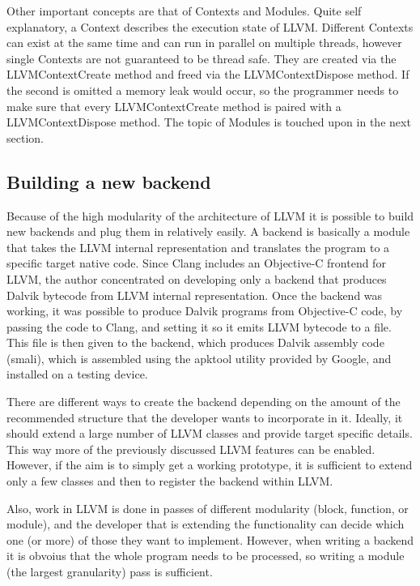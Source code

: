 \documentclass[parskip]{cs4rep}
\begin{document}
Other important concepts are that of Contexts and Modules. Quite self explanatory, a Context describes the execution state of LLVM. Different Contexts can exist at the same time and can run in parallel on multiple threads, however single Contexts are not guaranteed to be thread safe. They are created via the LLVMContextCreate method and freed via the LLVMContextDispose method. If the second is omitted a memory leak would occur, so the programmer needs to make sure that every LLVMContextCreate method is paired with a LLVMContextDispose method. The topic of Modules is touched upon in the next section.

\subsection{Building a new backend} \label{sec:buildingANewBackend}

Because of the high modularity of the architecture of LLVM it is possible to build new backends and plug them in relatively easily. A backend is basically a module that takes the LLVM internal representation and translates the program to a specific target native code. Since Clang includes an Objective-C frontend for LLVM, the author concentrated on developing only a backend that produces Dalvik bytecode from LLVM internal representation. Once the backend was working, it was possible to produce Dalvik programs from Objective-C code, by passing the code to Clang, and setting it so it emits LLVM bytecode to a file. This file is then given to the backend, which produces Dalvik assembly code (smali), which is assembled using the apktool utility provided by Google, and installed on a testing device.

There are different ways to create the backend depending on the amount of the recommended structure that the developer wants to incorporate in it. Ideally, it should extend a large number of LLVM classes and provide target specific details\cite{P8}. This way more of the previously discussed LLVM features can be enabled. However, if the aim is to simply get a working prototype, it is sufficient to extend only a few classes and then to register the backend within LLVM.

Also, work in LLVM is done in passes of different modularity (block, function, or module), and the developer that is extending the functionality can decide which one (or more) of those they want to implement. However, when writing a backend it is obvoius that the whole program needs to be processed, so writing a module (the largest granularity) pass is sufficient.
\end{document}
